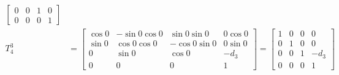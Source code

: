 \documentclass[10pt]{article}
\begin{document}
\begin{itemize}
\begin{align*}
\begin{bmatrix}
		0 & 0 & 1 & 0 \\
		0 & 0 & 0 & 1
		\end{bmatrix}
		\\
		T_{4}^3 &= \begin{bmatrix}
		\cos 0 & -\sin 0 \cos 0 &\sin 0 \sin 0 & 0 \cos 0 \\
		\sin 0 & \cos 0 \cos 0 & -\cos 0 \sin 0 & 0 \sin 0 \\
		0 & \sin 0 & \cos 0 & -d_3 \\
		0 & 0 & 0 & 1
		\end{bmatrix} = \begin{bmatrix}
		1 & 0 & 0 & 0 \\
		0 & 1 & 0 & 0 \\
		0 & 0 & 1 & -d_3 \\
		0 & 0 & 0 & 1
		\end{bmatrix}
	\end{align*}
\end{itemize}
\end{document}
